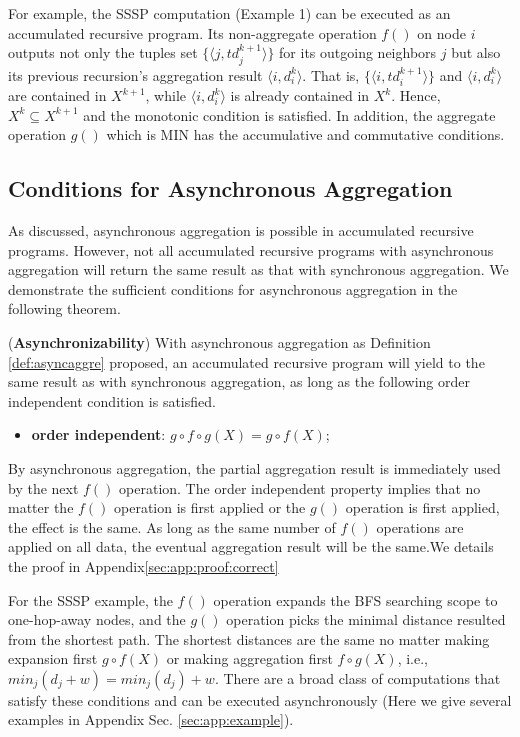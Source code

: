 For example, the SSSP computation (Example 1) can be executed as an accumulated recursive program. Its non-aggregate operation $f()$ on node $i$ outputs not only the tuples set $\{\langle j,td_j^{k+1}\rangle\}$ for its outgoing neighbors $j$ but also its previous recursion's aggregation result $\langle i,d_i^k\rangle$. That is, $\{\langle i,td_i^{k+1}\rangle\}$ and $\langle i,d_i^k\rangle$ are contained in $X^{k+1}$, while $\langle i,d_i^k\rangle$ is already contained in $X^{k}$. Hence, $X^{k}\subseteq X^{k+1}$ and the monotonic condition is satisfied. In addition, the aggregate operation $g()$ which is MIN has the accumulative and commutative conditions.


\subsection{Conditions for Asynchronous Aggregation}
\label{sec:async:condition}

As discussed, asynchronous aggregation is possible in accumulated recursive programs. However, not all accumulated recursive programs with asynchronous aggregation will return the same result as that with synchronous aggregation. We demonstrate the sufficient conditions for asynchronous aggregation in the following theorem.

\begin{theorem}
	\label{th:async}
	(\textbf{Asynchronizability}) With asynchronous aggregation as Definition \ref{def:asyncaggre} proposed, an accumulated recursive program will yield to the same result as with synchronous aggregation, as long as the following order independent condition is satisfied.
	\begin{itemize}
		\item \textbf{order independent}: $g\circ f\circ g(X)=g\circ f(X)$;
	\end{itemize}
\end{theorem}

By asynchronous aggregation, the partial aggregation result is immediately used by the next $f()$ operation. The order independent property implies that no matter the $f()$ operation is first applied or the $g()$ operation is first applied, the effect is the same. As long as the same number of $f()$ operations are applied on all data, the eventual aggregation result will be the same.We details the proof in Appendix\ref{sec:app:proof:correct}




For the SSSP example, the $f()$ operation expands the BFS searching scope to one-hop-away nodes, and the $g()$ operation picks the minimal distance resulted from the shortest path. The shortest distances are the same no matter making expansion first $g\circ f(X)$ or making aggregation first $f\circ g(X)$, i.e., $min_j(d_j+w)=min_j(d_j)+w$. There are a broad class of computations that satisfy these conditions and can be executed asynchronously (Here we give several examples in Appendix Sec. \ref{sec:app:example}).


